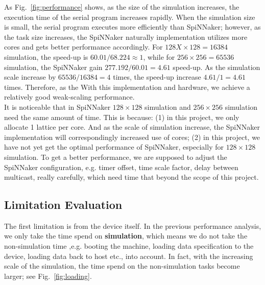 As Fig.~\ref{fig:performance} shows, as the size of the simulation increases, the execution time of the serial program increases rapidly. When the simulation size is small, the serial program executes more efficiently than SpiNNaker; however, as the task size increases, the SpiNNaker naturally implementation utilizes more cores and gets better performance accordingly. For $128X\times128=16384$ simulation, the speed-up is $60.01/68.224\approx1$, while for $256\times256=65536$ simulation, the SpiNNaker gain $277.192 / 60.01 = 4.61$ speed-up. As the simulation scale increase by $65536 / 16384 = 4$ times, the speed-up increase $4.61 / 1 = 4.61$ times. Therefore, as the With this implementation and hardware, we achieve a relatively good weak-scaling performance.\\

It is noticeable that in SpiNNaker $128\times128$ simulation and $256\times256$ simulation need the same amount of time. This is because: (1) in this project, we only allocate 1 lattice per core. And as the scale of simulation increase, the SpiNNaker implementation will correspondingly increased use of cores; (2) in this project, we have not yet get the optimal performance of SpiNNaker, especially for $128\times128$ simulation. To get a better performance, we are supposed to adjust the SpiNNaker configuration, e.g. timer offset, time scale factor, delay between multicast, really carefully, which need time that beyond the scope of this project.


\subsection{Limitation Evaluation} \label{sec:ana}
The first limitation is from the device itself. In the previous performance analysis, we only take the time spend on \textbf{simulation}, which means we do not take the non-simulation time ,e.g. booting the machine, loading data specification to the device, loading data back to host etc., into account. In fact, with the increasing scale of the simulation, the time spend on the non-simulation tasks become larger; see Fig.~\ref{fig:loading}.\\


